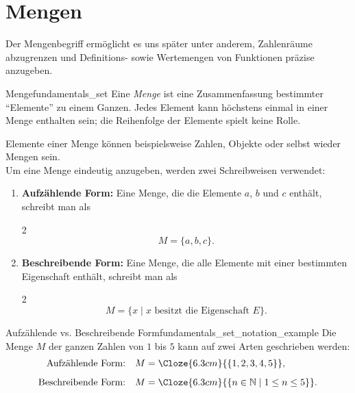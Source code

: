 \section{Mengen}
\label{sec:fundamentals_sets}

Der Mengenbegriff ermöglicht es uns später unter anderem,
Zahlenräume abzugrenzen und Definitions- sowie Wertemengen von Funktionen präzise anzugeben.

\begin{DefinitionBox}{Menge}{fundamentals_set}
  Eine \emph{Menge}  ist eine Zusammenfassung bestimmter
  \enquote{Elemente}  zu einem Ganzen. Jedes Element
  kann höchstens einmal in einer Menge enthalten sein; die Reihenfolge der
  Elemente spielt keine Rolle.
\end{DefinitionBox}

Elemente einer Menge können beispielsweise Zahlen, Objekte oder selbst wieder Mengen sein.\\

Um eine Menge eindeutig anzugeben, werden zwei Schreibweisen verwendet:
\begin{enumerate}[label=(\roman*),itemsep=0.8em]
  \item \textbf{Aufzählende Form:} Eine Menge, die die Elemente $a$, $b$ und
    $c$ enthält, schreibt man als
    \begin{ClozeArea}[33]{2}
      \[
        M=\{a,b,c\}.
      \]
    \end{ClozeArea}
  \item \textbf{Beschreibende Form:} Eine Menge, die alle Elemente mit einer
    bestimmten Eigenschaft enthält, schreibt man als
    \begin{ClozeArea}[33]{2}
      \[
        M=\{x\mid x\text{ besitzt die Eigenschaft }E\}.
      \]
    \end{ClozeArea}
\end{enumerate}

\begin{ExampleBox}{Aufzählende vs. Beschreibende Form}{fundamentals_set_notation_example}
  Die Menge $M$ der ganzen Zahlen von $1$ bis $5$ kann auf zwei Arten
  geschrieben werden:
  \begin{align*}
    \text{Aufzählende Form:}\quad
      M &= \Cloze{6.3cm}{\{1,2,3,4,5\}},\\[0.5em]
    \text{Beschreibende Form:}\quad
      M &= \Cloze{6.3cm}{\{n\in\mathbb{N}\mid 1\leq n\leq 5\}}.
  \end{align*}
\end{ExampleBox}

